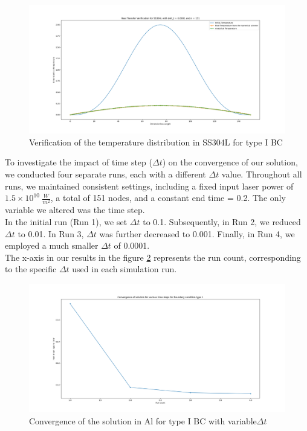 \begin{figure}[h]
  \centering
  \includegraphics[width=17cm]{img/Amor_t1.png}
  \caption{Verification of the temperature distribution in SS304L for type I BC}
  \label{fig:Temp_Dist_in_amorphous}
\end{figure}
\newpage
To investigate the impact of time step ($\Delta t$) on the convergence of our solution, we conducted four separate runs, each with a different $\Delta t$ value. Throughout all runs, we maintained consistent settings, including a fixed input laser power of $1.5 \times 10^{10} \ \frac{W}{m^2}$, a total of 151 nodes, and a constant end time = 0.2. The only variable we altered was the time step.\\
In the initial run (Run 1), we set $\Delta t$ to 0.1. Subsequently, in Run 2, we reduced $\Delta t$ to 0.01. In Run 3, $\Delta t$ was further decreased to 0.001. Finally, in Run 4, we employed a much smaller $\Delta t$ of 0.0001.\\
The x-axis in our results in the figure \ref{fig:convergence_Al} represents the run count, corresponding to the specific $\Delta t$ used in each simulation run.
\begin{figure}[h]
  \centering
  \includegraphics[width=13cm]{img/Error_convergence_for_BS1_delt_time.png}
  \caption{Convergence of the solution in Al for type I BC with variable$\Delta t$}
  \label{fig:convergence_Al}
\end{figure}

